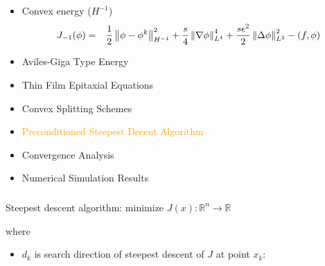 \documentclass[amstex]{beamer}
\newcommand{\wuhao}{\fontsize{10.5pt}{\baselineskip}\selectfont}    %
\begin{document}
\begin{CJK*}{GBK}{kai}
{\begin{itemize}
		\item Convex energy ($H^{-1}$)
		\begin{eqnarray*}
			J_{-1}(\phi) &=&  \frac{1}{2}\left\|\phi-\phi^k\right\|^2_{H^{-1}}+\frac{s}{4}\left\|\nabla\phi\right\|^4_{L^4}+ \frac{s\epsilon^2}{2} \left\|  \Delta \phi  \right\|^2_{L^2}-(f,\phi)
		\end{eqnarray*}
	\end{itemize}
}
\begin{frame}
	\begin{itemize}%
		\item \textcolor{orange!10}{Aviles-Giga Type Energy}
		\item \textcolor{orange!10}{Thin Film Epitaxial Equations}
		\item \textcolor{orange!10}{Convex Splitting Schemes}
		\item \textcolor{orange}{Preconditioned Steepest Decent Algorithm}
		\item \textcolor{orange!10}{Convergence Analysis}
		\item \textcolor{orange!10}{Numerical Simulation Results}
	\end{itemize}
\end{frame}
\begin{frame}
	\frametitle{\wuhao{\bf The Steepest Decent Algorithm}}
	Steepest descent algorithm: minimize $J	 (x): \mathbb{R}^n\to \mathbb{R}$
	\begin{center}
		\colorbox{orange}{}
	\end{center}
	where
	\begin{itemize}
		\item $d_k$ is search direction of steepest descent of $J$ at point $x_k$:

\end{itemize}
\end{frame}
\end{CJK*}
\end{document}
